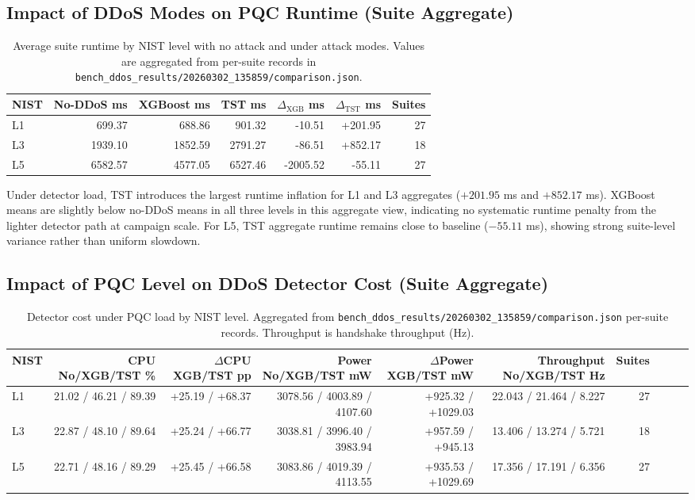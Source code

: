 \subsection{Impact of DDoS Modes on PQC Runtime (Suite Aggregate)}
\begin{table}[t]
\centering
\caption{Average suite runtime by NIST level with no attack and under attack modes. Values are aggregated from per-suite records in \texttt{bench\_ddos\_results/20260302\_135859/comparison.json}.}
\footnotesize
\setlength{\tabcolsep}{4pt}
\begin{tabular}{@{}lrrrrrr@{}}\toprule
NIST & No-DDoS ms & XGBoost ms & TST ms & $\Delta_{\text{XGB}}$ ms & $\Delta_{\text{TST}}$ ms & Suites \\ \midrule
L1 & 699.37 & 688.86 & 901.32 & -10.51 & +201.95 & 27 \\
L3 & 1939.10 & 1852.59 & 2791.27 & -86.51 & +852.17 & 18 \\
L5 & 6582.57 & 4577.05 & 6527.46 & -2005.52 & -55.11 & 27 \\
\bottomrule\end{tabular}
\label{tab:ddos-impact-on-pqc}
\end{table}

Under detector load, TST introduces the largest runtime inflation for L1 and L3 aggregates ($+201.95$ ms and $+852.17$ ms). XGBoost means are slightly below no-DDoS means in all three levels in this aggregate view, indicating no systematic runtime penalty from the lighter detector path at campaign scale. For L5, TST aggregate runtime remains close to baseline ($-55.11$ ms), showing strong suite-level variance rather than uniform slowdown.

\subsection{Impact of PQC Level on DDoS Detector Cost (Suite Aggregate)}
\begin{table}[t]
\centering
\caption{Detector cost under PQC load by NIST level. Aggregated from \texttt{bench\_ddos\_results/20260302\_135859/comparison.json} per-suite records. Throughput is handshake throughput (Hz).}
\footnotesize
\setlength{\tabcolsep}{3.5pt}
\begin{tabular}{@{}lrrrrrrrrr@{}}\toprule
NIST & CPU No/XGB/TST \% & $\Delta$CPU XGB/TST pp & Power No/XGB/TST mW & $\Delta$Power XGB/TST mW & Throughput No/XGB/TST Hz & Suites \\ \midrule
L1 & 21.02 / 46.21 / 89.39 & +25.19 / +68.37 & 3078.56 / 4003.89 / 4107.60 & +925.32 / +1029.03 & 22.043 / 21.464 / 8.227 & 27 \\
L3 & 22.87 / 48.10 / 89.64 & +25.24 / +66.77 & 3038.81 / 3996.40 / 3983.94 & +957.59 / +945.13 & 13.406 / 13.274 / 5.721 & 18 \\
L5 & 22.71 / 48.16 / 89.29 & +25.45 / +66.58 & 3083.86 / 4019.39 / 4113.55 & +935.53 / +1029.69 & 17.356 / 17.191 / 6.356 & 27 \\
\bottomrule\end{tabular}
\label{tab:pqc-impact-on-ddos}
\end{table}

